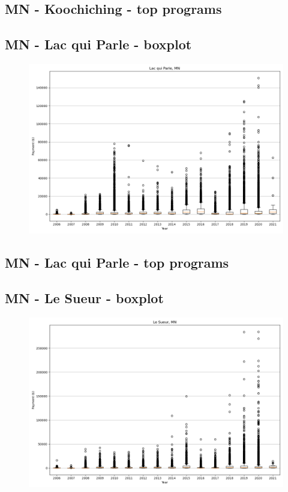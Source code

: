 \subsection*{MN - Koochiching - top programs}

\newpage
\subsection*{MN - Lac qui Parle - boxplot}
\begin{figure}[h]
\centering
\includegraphics[width=7in]{../output/boxplots/counties/Lac qui Parle-MN_boxplot.png}
\end{figure}


\subsection*{MN - Lac qui Parle - top programs}

\newpage
\subsection*{MN - Le Sueur - boxplot}
\begin{figure}[h]
\centering
\includegraphics[width=7in]{../output/boxplots/counties/Le Sueur-MN_boxplot.png}
\end{figure}


